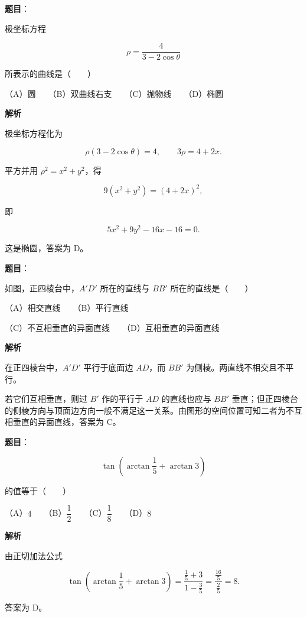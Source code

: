 \begin{answer}

\textbf{题目}：

极坐标方程

\nopagebreak[4]
\[
\rho=\frac4{3-2\cos\theta}
\]

所表示的曲线是\mbox{（　　）}

（A）圆　　（B）双曲线右支　　（C）抛物线　　（D）椭圆

\textbf{解析}

极坐标方程化为

\nopagebreak[4]
\[
\rho(3-2\cos\theta)=4,
\qquad
3\rho=4+2x.
\]

平方并用 $\rho^2=x^2+y^2$，得

\nopagebreak[4]
\[
9(x^2+y^2)=(4+2x)^2,
\]

即

\nopagebreak[4]
\[
5x^2+9y^2-16x-16=0.
\]

这是椭圆，答案为 D。


\end{answer}
\begin{answer}

\textbf{题目}：

如图，正四棱台中，$A'D'$ 所在的直线与 $BB'$ 所在的直线是\mbox{（　　）}
\nopagebreak[4]
\begin{center}\end{center}
\nopagebreak[4]
（A）相交直线　　（B）平行直线

（C）不互相垂直的异面直线　　（D）互相垂直的异面直线

\textbf{解析}

在正四棱台中，$A'D'$ 平行于底面边 $AD$，而 $BB'$ 为侧棱。两直线不相交且不平行。

若它们互相垂直，则过 $B'$ 作的平行于 $AD$ 的直线也应与 $BB'$ 垂直；但正四棱台的侧棱方向与顶面边方向一般不满足这一关系。由图形的空间位置可知二者为不互相垂直的异面直线，答案为 C。


\end{answer}
\begin{answer}

\textbf{题目}：

\nopagebreak[4]
\[
\tan\left(\arctan\frac15+\arctan3\right)
\]

的值等于\mbox{（　　）}

（A）$4$　　（B）$\dfrac12$　　（C）$\dfrac18$　　（D）$8$

\textbf{解析}

由正切加法公式

\nopagebreak[4]
\[
\tan\left(\arctan\frac15+\arctan3\right)
=\frac{\frac15+3}{1-\frac35}
=\frac{\frac{16}{5}}{\frac25}=8.
\]

答案为 D。


\end{answer}
